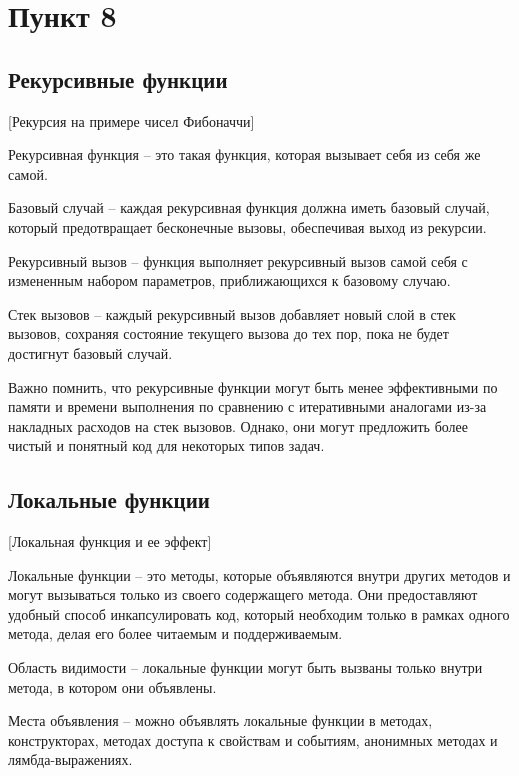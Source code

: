 \documentclass{bsuir}
\begin{document}
\maketitle

\chapter{Пункт 8}

\section{Рекурсивные функции}

[Рекурсия на примере чисел Фибоначчи]

Рекурсивная функция -- это такая функция, которая вызывает себя из себя же
самой.

Базовый случай -- каждая рекурсивная функция должна иметь базовый случай,
который предотвращает бесконечные вызовы, обеспечивая выход из рекурсии.

Рекурсивный вызов -- функция выполняет рекурсивный вызов самой себя с измененным
набором параметров, приближающихся к базовому случаю.

Стек вызовов -- каждый рекурсивный вызов добавляет новый слой в стек вызовов,
сохраняя состояние текущего вызова до тех пор, пока не будет достигнут базовый
случай.

Важно помнить, что рекурсивные функции могут быть менее эффективными по памяти и
времени выполнения по сравнению с итеративными аналогами из-за накладных
расходов на стек вызовов. Однако, они могут предложить более чистый и понятный
код для некоторых типов задач.

\section{Локальные функции}

[Локальная функция и ее эффект]

Локальные функции -- это методы, которые объявляются внутри других
методов и могут вызываться только из своего содержащего метода. Они
предоставляют удобный способ инкапсулировать код, который необходим только в
рамках одного метода, делая его более читаемым и поддерживаемым.

Область видимости -- локальные функции могут быть вызваны только внутри метода,
в котором они объявлены.
    
Места объявления -- можно объявлять локальные функции в методах,
конструкторах, методах доступа к свойствам и событиям, анонимных методах и
лямбда-выражениях.
    
\end{document}
